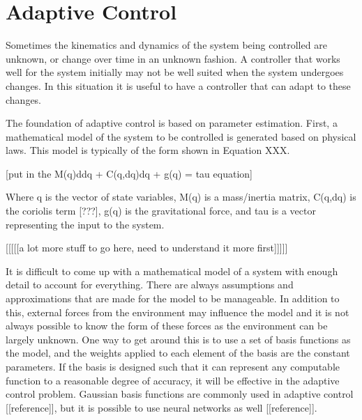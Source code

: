 \documentclass[letterpaper,12pt,titlepage,oneside,final]{book}
\begin{document}
\section{Adaptive Control}


Sometimes the kinematics and dynamics of the system being controlled are unknown, or change over time in an unknown fashion. A controller that works well for the system initially may not be well suited when the system undergoes changes. In this situation it is useful to have a controller that can adapt to these changes.

The foundation of adaptive control is based on parameter estimation. First, a mathematical model of the system to be controlled is generated based on physical laws. This model is typically of the form shown in Equation XXX.

[put in the M(q)ddq + C(q,dq)dq + g(q) = tau equation]

Where q is the vector of state variables, M(q) is a mass/inertia matrix, C(q,dq) is the coriolis term [???], g(q) is the gravitational force, and tau is a vector representing the input to the system.

[[[[[a lot more stuff to go here, need to understand it more first]]]]]

It is difficult to come up with a mathematical model of a system with enough detail to account for everything. There are always assumptions and approximations that are made for the model to be manageable. In addition to this, external forces from the environment may influence the model and it is not always possible to know the form of these forces as the environment can be largely unknown. One way to get around this is to use a set of basis functions as the model, and the weights applied to each element of the basis are the constant parameters. If the basis is designed such that it can represent any computable function to a reasonable degree of accuracy, it will be effective in the adaptive control problem. Gaussian basis functions are commonly used in adaptive control [[reference]], but it is possible to use neural networks as well [[reference]].
\end{document}
